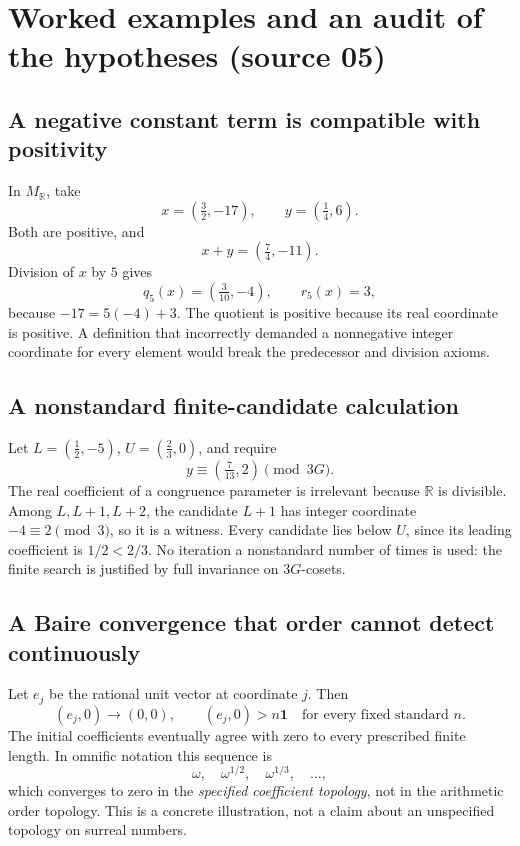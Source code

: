 \documentclass[11pt]{article}
\numberwithin{equation}{section}
\theoremstyle{definition}
\theoremstyle{remark}
\newcommand{\R}{\mathbb R}
\newcommand{\MR}{M_{\R}}
\newcommand{\one}{\mathbf 1}
\begin{document}
\appendix

\section{Worked examples and an audit of the hypotheses (source 05)}
\label{pma:pr:sec:audit}

\subsection{A negative constant term is compatible with positivity}

In $\MR$, take
\[
 x=(\tfrac32,-17),\qquad y=(\tfrac14,6).
\]
Both are positive, and
\[
 x+y=(\tfrac74,-11).
\]
Division of $x$ by $5$ gives
\[
 q_5(x)=(\tfrac3{10},-4),\qquad r_5(x)=3,
\]
because $-17=5(-4)+3$. The quotient is positive because its real
coordinate is positive. A definition that incorrectly demanded a
nonnegative integer coordinate for every element would break the
predecessor and division axioms.

\subsection{A nonstandard finite-candidate calculation}

Let $L=(\tfrac12,-5)$, $U=(\tfrac23,0)$, and require
\[
 y\equiv(\tfrac7{13},2)\pmod{3G}.
\]
The real coefficient of a congruence parameter is irrelevant because
$\R$ is divisible. Among $L,L+1,L+2$, the candidate $L+1$ has integer
coordinate $-4\equiv2\pmod3$, so it is a witness. Every candidate lies
below $U$, since its leading coefficient is $1/2<2/3$.
No iteration a nonstandard number of times is used: the finite search is
justified by full invariance on $3G$-cosets.

\subsection{A Baire convergence that order cannot detect continuously}

Let $e_j$ be the rational unit vector at coordinate $j$. Then
\[
 (e_j,0)\to(0,0),\qquad (e_j,0)>n\one
 \quad\text{for every fixed standard }n.
\]
The initial coefficients eventually agree with zero to every prescribed
finite length. In omnific notation this sequence is
\[
 \omega,\quad\omega^{1/2},\quad\omega^{1/3},\quad\ldots,
\]
which converges to zero in the \emph{specified coefficient topology},
not in the arithmetic order topology. This is a concrete illustration,
not a claim about an unspecified topology on surreal numbers.
\end{document}
